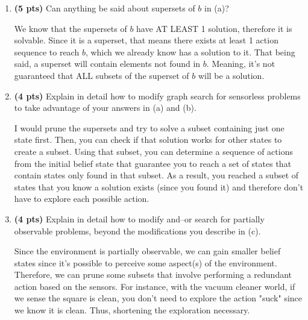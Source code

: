 \documentclass{article}
\begin{document}
\begin{enumerate}
\begin{enumerate}[label=($\alph*$)]


    \item \textbf{(5 pts)} Can anything be said about supersets of $b$ in (a)?

    \color{blue}
        We know that the supersets of $b$ have AT LEAST 1 solution, therefore it is solvable. Since it is a superset, that means there exists at least 1 action sequence to reach $b$, which we already know has a solution to it. That being said, a superset will contain elements not found in $b$. Meaning, it's not guaranteed that ALL subsets of the superset of $b$ will be a solution. 
    \color{black}


    
    \item \textbf{(4 pts)} Explain in detail how to modify graph search for sensorless problems to take advantage of your answers in (a) and (b).

    \color{blue}
        I would prune the supersets and try to solve a subset containing just one state first. Then, you can check if that solution works for other states to create a subset. Using that subset, you can determine a sequence of actions from the initial belief state that guarantee you to reach a set of states that contain states only found in that subset. As a result, you reached a subset of states that you know a solution exists (since you found it) and therefore don't have to explore each possible action.
    \color{black}


    
    \item \textbf{(4 pts)} Explain in detail how to modify and–or search for partially observable problems, beyond the modifications you describe in (c).

    \color{blue}
        Since the environment is partially observable, we can gain smaller belief states since it's possible to perceive some aspect(s) of the environment. Therefore, we can prune some subsets that involve performing a redundant action based on the sensors. For instance, with the vacuum cleaner world, if we sense the square is clean, you don't need to explore the action "suck" since we know it is clean. Thus, shortening the exploration necessary.
    \color{black}


\end{enumerate}
\end{enumerate}
\end{document}
